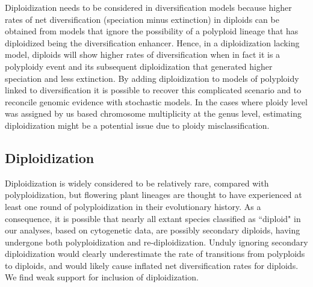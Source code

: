 
Diploidization needs to be considered in diversification models because higher rates of net diversification (speciation minus extinction) in diploids can be obtained from models that ignore the possibility of a polyploid lineage that has diploidized being the diversification enhancer. 
Hence, in a diploidization lacking model, diploids will show higher rates of diversification when in fact it is a polyploidy event and its subsequent diploidization that generated higher speciation and less extinction.  
By adding diploidization to models of polyploidy linked to diversification it is possible to recover this complicated scenario and to reconcile genomic evidence with stochastic models. 
In the cases where ploidy level was assigned by us based chromosome multiplicity at the genus level, estimating diploidization  might be a potential issue due to ploidy misclassification.  


\subsection*{Diploidization}

Diploidization is widely considered to be relatively rare, compared with polyploidization, but flowering plant lineages are thought to have experienced at least one round of polyploidization in their evolutionary history. %
As a consequence, it is possible that nearly all extant species classified as ``diploid" in our analyses, based on cytogenetic data, are possibly secondary diploids, having undergone both polyploidization and re-diploidization.
Unduly ignoring secondary diploidization would clearly underestimate the rate of transitions from polyploids to diploids, and would likely cause inflated net diversification rates for diploids. %
We find weak support for inclusion of diploidization. %

